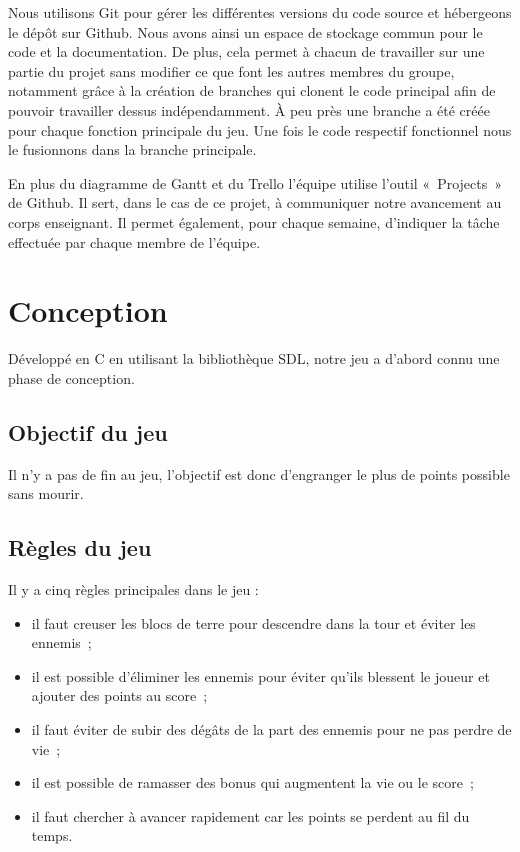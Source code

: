 \documentclass[a4paper,12pt]{article}
\begin{document}
Nous utilisons Git pour gérer les différentes versions du code source et hébergeons le dépôt sur Github.
Nous avons ainsi un espace de stockage commun pour le code et la documentation. De plus, cela permet à chacun de travailler sur une partie du projet sans modifier ce que font les autres membres du groupe, notamment grâce à la création de branches qui clonent le code principal afin de pouvoir travailler dessus indépendamment.
À peu près une branche a été créée pour chaque fonction principale du jeu. Une fois le code respectif fonctionnel nous le fusionnons dans la branche principale.

En plus du diagramme de Gantt et du Trello l’équipe utilise l’outil « Projects » de Github.
Il sert, dans le cas de ce projet, à communiquer notre avancement au corps enseignant. 
Il permet également, pour chaque semaine, d’indiquer la tâche effectuée par chaque membre de l’équipe.



\section{Conception}

Développé en C en utilisant la bibliothèque SDL, notre jeu a d'abord connu une phase de conception.

\subsection{Objectif du jeu}
Il n’y a pas de fin au jeu, l’objectif est donc d’engranger le plus de points possible sans mourir.

\subsection{Règles du jeu}
Il y a cinq règles principales dans le jeu :
\begin{itemize}
	\item il faut creuser les blocs de terre pour descendre dans la tour et éviter les ennemis ;
	\item il est possible d’éliminer les ennemis pour éviter qu’ils blessent le joueur et ajouter des points au score ;
	\item il faut éviter de subir des dégâts de la part des ennemis pour ne pas perdre de vie ;
	\item il est possible de ramasser des bonus qui augmentent la vie ou le score ;
	\item il faut chercher à avancer rapidement car les points se perdent au fil du temps.
\end{itemize}
\end{document}
